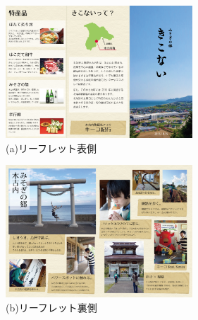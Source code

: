 \begin{figure}[htbp]
 \begin{center}
\includegraphics[width=7cm, bb=0 0 857 570]{leaflet_front.png}
 \end{center}
\addtocounter{figure}{+0}
 \caption{(a)リーフレット表側}
 \label{fig:one}
\end{figure}

\begin{figure}[htbp]
 \begin{center}
\includegraphics[width=7cm, bb=0 0 857 570]{leaflet_back.png}
 \end{center}
\addtocounter{figure}{-1}
 \caption{(b)リーフレット裏側}
 \label{fig:one}
\end{figure}

